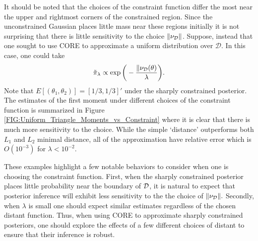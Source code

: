 \documentclass[10pt,fleqn]{article}
\DeclareMathOperator{\1}{\mathbbm{1}} \DeclareMathOperator{\bigO}{\mc O}
\begin{document}
{It should be noted that the choices of the constraint function differ the most near the upper and rightmost corners of the constrained region.  Since the unconstrained Gaussian places little mass near these regions initially it is not surprising that there is little sensitivity to the choice $\| \nu_{\mathcal{D}}\|$.  Suppose, instead that one sought to use CORE to approximate a uniform distribution over $\mathcal{D}$. In this case, one could take 
\begin{equation}
\tilde{\pi}_\lambda \propto \exp\bigg(-\frac{\| \nu_{\mathcal{D}} (\theta)}{\lambda}\bigg).
\label{EQ:Relaxed_Uniform_Triangle_Constraint}
\end{equation}
Note that $E[(\theta_1,\theta_2)] = [1/3,1/3]'$ under the sharply constrained posterior.  The estimates of the first moment under different choices of the constraint function is summarized in Figure \ref{FIG:Uniform_Triangle_Moments_vs_Constraint} where it is clear that there is much more sensitivity to the choice.  While the simple `distance' outperforms both $L_1$ and $L_2$ minimal distance, all of the approximation have relative error which is $O(10^{-3})$ for $\lambda < 10^{-2}$. 


These examples highlight a few notable behaviors to consider when one is choosing the constraint function.  First, when the sharply constrained posterior places little probability near the boundary of $\mathcal{D}$, it is natural to expect that posterior inference will exhibit less sensitivity to the the choice of $\| \nu_{\mathcal{D}}\|.$ Secondly, when $\lambda$ is small one should expect similar estimates regardless of the chosen distant function.  Thus, when using CORE to approximate sharply constrained posteriors, one should explore the effects of a few different choices of distant to ensure that their inference is robust.
 }
\end{document}
